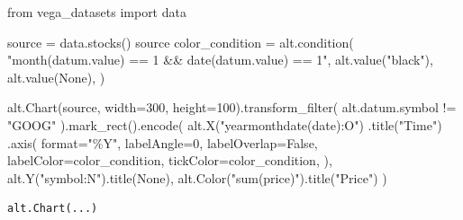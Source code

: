 \documentclass[
  letterpaper,
  DIV=11,
  numbers=noendperiod]{scrartcl}
\newenvironment{Shaded}{\begin{snugshade}}{\end{snugshade}}
\newcommand{\BuiltInTok}[1]{\textcolor[rgb]{0.00,0.23,0.31}{#1}}
\newcommand{\DecValTok}[1]{\textcolor[rgb]{0.68,0.00,0.00}{#1}}
\newcommand{\ImportTok}[1]{\textcolor[rgb]{0.00,0.46,0.62}{#1}}
\newcommand{\NormalTok}[1]{\textcolor[rgb]{0.00,0.23,0.31}{#1}}
\newcommand{\OperatorTok}[1]{\textcolor[rgb]{0.37,0.37,0.37}{#1}}
\newcommand{\StringTok}[1]{\textcolor[rgb]{0.13,0.47,0.30}{#1}}
\newcommand{\VariableTok}[1]{\textcolor[rgb]{0.07,0.07,0.07}{#1}}
\begin{document}
\begin{Shaded}
\begin{Highlighting}[]
\ImportTok{from}\NormalTok{ vega\_datasets }\ImportTok{import}\NormalTok{ data}

\NormalTok{source }\OperatorTok{=}\NormalTok{ data.stocks()}
\NormalTok{source}
\NormalTok{color\_condition }\OperatorTok{=}\NormalTok{ alt.condition(}
    \StringTok{"month(datum.value) == 1 \&\& date(datum.value) == 1"}\NormalTok{,}
\NormalTok{    alt.value(}\StringTok{"black"}\NormalTok{),}
\NormalTok{    alt.value(}\VariableTok{None}\NormalTok{),}
\NormalTok{)}

\NormalTok{alt.Chart(source, width}\OperatorTok{=}\DecValTok{300}\NormalTok{, height}\OperatorTok{=}\DecValTok{100}\NormalTok{).transform\_filter(}
\NormalTok{    alt.datum.symbol }\OperatorTok{!=} \StringTok{"GOOG"}
\NormalTok{).mark\_rect().encode(}
\NormalTok{    alt.X(}\StringTok{"yearmonthdate(date):O"}\NormalTok{)}
\NormalTok{        .title(}\StringTok{"Time"}\NormalTok{)}
\NormalTok{        .axis(}
            \BuiltInTok{format}\OperatorTok{=}\StringTok{"\%Y"}\NormalTok{,}
\NormalTok{            labelAngle}\OperatorTok{=}\DecValTok{0}\NormalTok{,}
\NormalTok{            labelOverlap}\OperatorTok{=}\VariableTok{False}\NormalTok{,}
\NormalTok{            labelColor}\OperatorTok{=}\NormalTok{color\_condition,}
\NormalTok{            tickColor}\OperatorTok{=}\NormalTok{color\_condition,}
\NormalTok{        ),}
\NormalTok{    alt.Y(}\StringTok{"symbol:N"}\NormalTok{).title(}\VariableTok{None}\NormalTok{),}
\NormalTok{    alt.Color(}\StringTok{"sum(price)"}\NormalTok{).title(}\StringTok{"Price"}\NormalTok{)}
\NormalTok{)}
\end{Highlighting}
\end{Shaded}

\begin{verbatim}
alt.Chart(...)
\end{verbatim}
\end{document}
